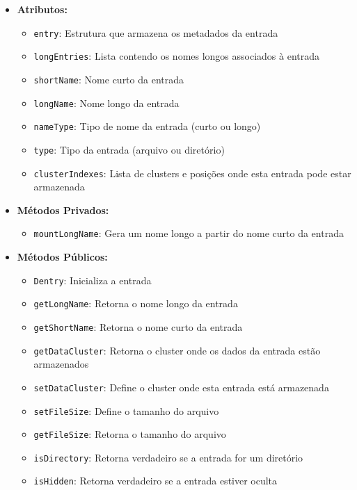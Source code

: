 \documentclass[
    12pt,				%
    oneside,   	        %
    a4paper,			%
    english,			%
    french,				%
    spanish,			%
    brazil,				%
    ]{pacotes/abntex2}
\begin{document}
\begin{itemize}
    \item \textbf{Atributos:}
        \begin{itemize}
            \item \texttt{entry}: Estrutura que armazena os metadados da entrada
            \item \texttt{longEntries}: Lista contendo os nomes longos associados à entrada
            \item \texttt{shortName}: Nome curto da entrada
            \item \texttt{longName}: Nome longo da entrada
            \item \texttt{nameType}: Tipo de nome da entrada (curto ou longo)
            \item \texttt{type}: Tipo da entrada (arquivo ou diretório)
            \item \texttt{clusterIndexes}: Lista de clusters e posições onde esta entrada pode estar armazenada
        \end{itemize}
    \item \textbf{Métodos Privados:}
        \begin{itemize}
            \item \texttt{mountLongName}: Gera um nome longo a partir do nome curto da entrada
        \end{itemize}
    \item \textbf{Métodos Públicos:}
        \begin{itemize}
            \item \texttt{Dentry}: Inicializa a entrada
            \item \texttt{getLongName}: Retorna o nome longo da entrada
            \item \texttt{getShortName}: Retorna o nome curto da entrada
            \item \texttt{getDataCluster}: Retorna o cluster onde os dados da entrada estão armazenados
            \item \texttt{setDataCluster}: Define o cluster onde esta entrada está armazenada
            \item \texttt{setFileSize}: Define o tamanho do arquivo
            \item \texttt{getFileSize}: Retorna o tamanho do arquivo
            \item \texttt{isDirectory}: Retorna verdadeiro se a entrada for um diretório
            \item \texttt{isHidden}: Retorna verdadeiro se a entrada estiver oculta

\end{itemize}
\end{itemize}
\end{document}
